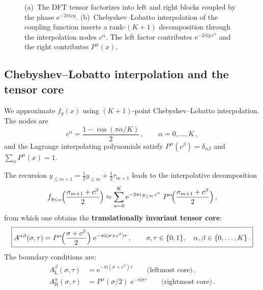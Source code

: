 \documentclass[11pt,a4paper]{article}
\theoremstyle{definition}
\theoremstyle{remark}
\newcommand{\ee}{\mathrm{e}}
\newcommand{\ii}{\mathrm{i}}
\begin{document}
\begin{figure}[ht]
\caption{(a)~The DFT tensor factorizes into left and right blocks coupled by the phase $\ee^{-2\pi\ii xy}$.
(b)~Chebyshev--Lobatto interpolation of the coupling function inserts a rank-$(K\!+\!1)$ decomposition through the interpolation nodes $c^\alpha$.  The left factor contributes $\ee^{-2\pi\ii y\,c^\alpha}$ and the right contributes $P^\alpha(x)$.}
\label{fig:factorization}
\end{figure}

\subsection{Chebyshev--Lobatto interpolation and the tensor core}

We approximate $f_y(x)$ using $(K+1)$-point Chebyshev--Lobatto interpolation. The nodes are
\begin{equation}\label{eq:cheb_nodes}
  c^\alpha = \frac{1-\cos(\pi\alpha/K)}{2}\,,\qquad \alpha=0,\ldots,K\,,
\end{equation}
and the Lagrange interpolating polynomials satisfy $P^\alpha(c^\beta) = \delta_{\alpha\beta}$ and $\sum_\alpha P^\alpha(x)=1$.

The recursion $y_{\le m+1} = \tfrac{1}{2}y_{\le m} + \tfrac{1}{2}\tau_{m+1}$ leads to the interpolative decomposition
\begin{equation}
  f_{y_{\le m}}\!\Bigl(\frac{\sigma_{m+1}+c^\beta}{2}\Bigr)
  \approx \sum_{\alpha=0}^K \ee^{-2\pi\ii\, y_{\le m}\, c^\alpha}\;
  P^\alpha\!\Bigl(\frac{\sigma_{m+1}+c^\beta}{2}\Bigr)\,,
\end{equation}
from which one obtains the \textbf{translationally invariant tensor core}:
\begin{equation}\label{eq:core}
  \boxed{
  A^{\alpha\beta}(\sigma,\tau) = P^\alpha\!\Bigl(\frac{\sigma+c^\beta}{2}\Bigr)\;
  \ee^{-\pi\ii(\sigma+c^\beta)\tau}\,,\qquad
  \sigma,\tau\in\{0,1\},\quad \alpha,\beta\in\{0,\ldots,K\}\,.
  }
\end{equation}
The boundary conditions are:
\begin{align}
  A_{\mathrm{L}}^\beta(\sigma,\tau) &= \ee^{-\pi\ii(\sigma+c^\beta)\tau}
  \qquad\text{(leftmost core)}\,,\label{eq:left_core}\\
  A_{\mathrm{R}}^\alpha(\sigma,\tau) &= P^\alpha(\sigma/2)\;\ee^{-\pi\ii\sigma\tau}
  \qquad\text{(rightmost core)}\,.\label{eq:right_core}
\end{align}
\end{document}
